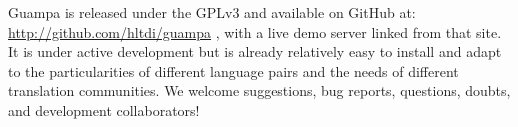 \documentclass[10pt, a4paper]{article}
\begin{document}
Guampa is released under the GPLv3 and available on GitHub at:
\\
\url{http://github.com/hltdi/guampa} , with a live demo server linked from that
site. It is under active development but is already relatively easy to install
and adapt to the particularities of different language pairs and the needs of
different translation communities. We welcome suggestions, bug reports,
questions, doubts, and development collaborators!



\end{document}
